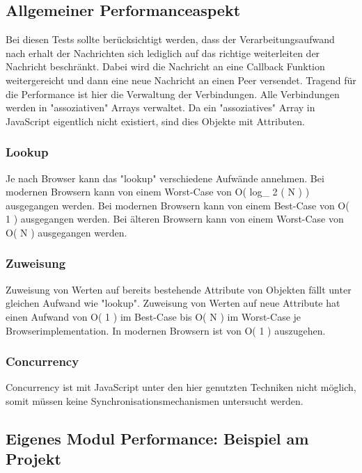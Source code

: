 \subsection{Allgemeiner Performanceaspekt}
Bei diesen Tests sollte berücksichtigt werden, dass der Verarbeitungsaufwand nach erhalt der Nachrichten sich lediglich auf das richtige weiterleiten der Nachricht beschränkt. 
Dabei wird die Nachricht an eine Callback Funktion weitergereicht und dann eine neue Nachricht an einen Peer versendet. 
Tragend für die Performance ist hier die Verwaltung der Verbindungen.
Alle Verbindungen werden in "assoziativen" Arrays verwaltet. Da ein "assoziatives" Array in JavaScript eigentlich nicht existiert, sind dies Objekte mit Attributen. 



\subsubsection{Lookup}
Je nach Browser kann das "lookup" verschiedene Aufwände annehmen.
Bei modernen Browsern kann von einem Worst-Case von \mathcal O\left( log_{ 2 }\left( N \right) \right) ausgegangen werden.
Bei modernen Browsern kann von einem Best-Case von \mathcal O\left( 1 \right) ausgegangen werden.
Bei älteren Browsern kann von einem Worst-Case von \mathcal O\left( N \right) ausgegangen werden.



\subsubsection{Zuweisung}
Zuweisung von Werten auf bereits bestehende Attribute von Objekten fällt unter gleichen Aufwand wie "lookup".
Zuweisung von Werten auf neue Attribute hat einen Aufwand von \mathcal O\left( 1 \right) im Best-Case bis \mathcal O\left( N \right) im Worst-Case je Browserimplementation. In modernen Browsern ist von \mathcal O\left( 1 \right) auszugehen.



\subsubsection{Concurrency}
Concurrency ist mit JavaScript unter den hier genutzten Techniken nicht möglich, somit müssen keine Synchronisationsmechanismen untersucht werden.




\subsection{Eigenes Modul Performance: Beispiel am Projekt}

